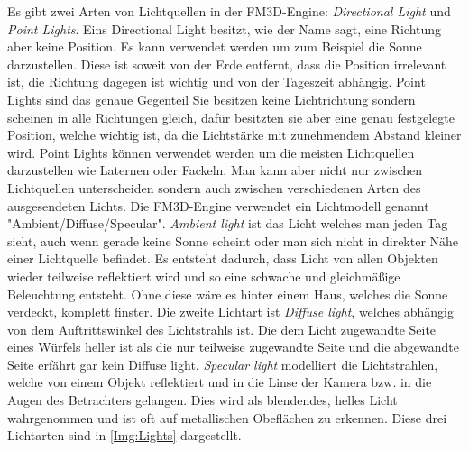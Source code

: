 Es gibt zwei Arten von Lichtquellen in der FM3D-Engine: \textit{Directional Light} und \textit{Point Lights}. Eins Directional Light besitzt, wie der Name sagt, eine Richtung aber keine Position. Es kann verwendet werden um zum Beispiel die Sonne darzustellen. Diese ist soweit von der Erde entfernt, dass die Position irrelevant ist, die Richtung dagegen ist wichtig und von der Tageszeit abhängig. Point Lights sind das genaue Gegenteil Sie besitzen keine Lichtrichtung sondern scheinen in alle Richtungen gleich, dafür besitzten sie aber eine genau festgelegte Position, welche wichtig ist, da die Lichtstärke mit zunehmendem Abstand kleiner wird. Point Lights können verwendet werden um die meisten Lichtquellen darzustellen wie Laternen oder Fackeln. Man kann aber nicht nur zwischen Lichtquellen unterscheiden sondern auch zwischen verschiedenen Arten des ausgesendeten Lichts. Die FM3D-Engine verwendet ein Lichtmodell genannt "Ambient/Diffuse/Specular". \textit{Ambient light} ist das Licht welches man jeden Tag sieht, auch wenn gerade keine Sonne scheint oder man sich nicht in direkter Nähe einer Lichtquelle befindet. Es entsteht dadurch, dass Licht von allen Objekten wieder teilweise reflektiert wird und so eine schwache und gleichmäßige Beleuchtung entsteht. Ohne diese wäre es hinter einem Haus, welches die Sonne verdeckt, komplett finster. Die zweite Lichtart ist \textit{Diffuse light}, welches abhängig von dem Auftrittswinkel des Lichtstrahls ist. Die dem Licht zugewandte Seite eines Würfels heller ist als die nur teilweise zugewandte Seite und die abgewandte Seite erfährt gar kein Diffuse light. \textit{Specular light} modelliert die Lichtstrahlen, welche von einem Objekt reflektiert und in die Linse der Kamera bzw. in die Augen des Betrachters gelangen. Dies wird als blendendes, helles Licht wahrgenommen und ist oft auf metallischen Obeflächen zu erkennen. Diese drei Lichtarten sind in \cref{Img:Lights} dargestellt.

